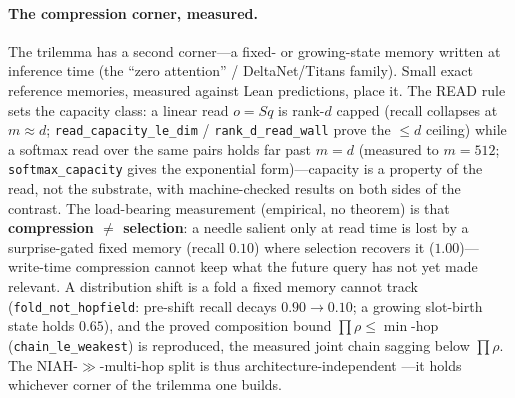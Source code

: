 \documentclass[11pt]{article}
\numberwithin{equation}{section}
\begin{document}
\paragraph{The compression corner, measured.} The trilemma has a second corner---a fixed- or growing-state
memory written at inference time (the ``zero attention'' / DeltaNet/Titans family). Small exact reference
memories, measured against Lean predictions, place it. The READ rule sets the capacity class: a linear read
$o = S q$ is rank-$d$ capped (recall collapses at $m\approx d$; \texttt{read\_capacity\_le\_dim} /
\texttt{rank\_d\_read\_wall} prove the $\le d$ ceiling) while a softmax read over the same pairs holds
far past $m=d$ (measured to $m=512$; \texttt{softmax\_capacity} gives the exponential form)---capacity is a
property of the read, not the substrate, with machine-checked results on both sides of the contrast. The load-bearing measurement (empirical, no theorem) is that
\textbf{compression $\neq$ selection}: a needle salient only at read time is lost by a surprise-gated fixed
memory (recall $0.10$) where selection recovers it ($1.00$)---write-time compression cannot keep what the future
query has not yet made relevant. A distribution shift is a fold a fixed memory cannot track
(\texttt{fold\_not\_hopfield}: pre-shift recall decays $0.90\to0.10$; a growing slot-birth state holds $0.65$),
and the proved composition bound $\prod\rho \le \min$-hop (\texttt{chain\_le\_weakest}) is reproduced, the
measured joint chain sagging below $\prod\rho$. The NIAH-$\gg$-multi-hop split is thus architecture-independent
---it holds whichever corner of the trilemma one builds.
\end{document}
